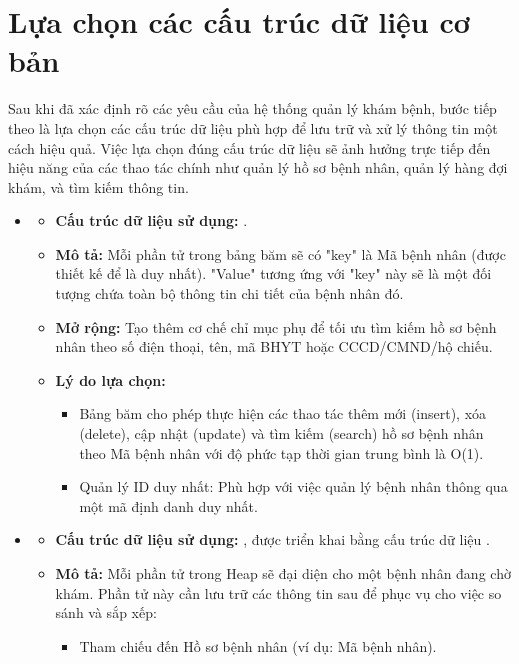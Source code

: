 \section{Lựa chọn các cấu trúc dữ liệu cơ bản}
Sau khi đã xác định rõ các yêu cầu của hệ thống quản lý khám bệnh, bước tiếp theo là lựa chọn các cấu trúc dữ liệu phù hợp để lưu trữ và xử lý thông tin một cách hiệu quả. Việc lựa chọn đúng cấu trúc dữ liệu sẽ ảnh hưởng trực tiếp đến hiệu năng của các thao tác chính như quản lý hồ sơ bệnh nhân, quản lý hàng đợi khám, và tìm kiếm thông tin.
\begin{itemize}
    \item {}
    \begin{itemize}
        \item {\bf Cấu trúc dữ liệu sử dụng:} .
        \item {\bf Mô tả:} Mỗi phần tử trong bảng băm sẽ có "key" là Mã bệnh nhân (được thiết kế để là duy nhất). "Value" tương ứng với "key" này sẽ là một đối tượng chứa toàn bộ thông tin chi tiết của bệnh nhân đó.
        \item {\bf Mở rộng:} Tạo thêm cơ chế chỉ mục phụ để tối ưu tìm kiếm hồ sơ bệnh nhân theo số điện thoại, tên, mã BHYT hoặc CCCD/CMND/hộ chiếu.
        \item {\bf Lý do lựa chọn:}
        \begin{itemize}
            \item Bảng băm cho phép thực hiện các thao tác thêm mới (insert), xóa (delete), cập nhật (update) và tìm kiếm (search) hồ sơ bệnh nhân theo Mã bệnh nhân với độ phức tạp thời gian trung bình là O(1). 
            \item Quản lý ID duy nhất: Phù hợp với việc quản lý bệnh nhân thông qua một mã định danh duy nhất.
        \end{itemize}
    \end{itemize}
    \item {}
    \begin{itemize}
        \item {\bf Cấu trúc dữ liệu sử dụng:} , được triển khai bằng cấu trúc dữ liệu .
        \item {\bf Mô tả:} Mỗi phần tử trong Heap sẽ đại diện cho một bệnh nhân đang chờ khám. Phần tử này cần lưu trữ các thông tin sau để phục vụ cho việc so sánh và sắp xếp:
        \begin{itemize}
            \item Tham chiếu đến Hồ sơ bệnh nhân (ví dụ: Mã bệnh nhân).

\end{itemize}
\end{itemize}
\end{itemize}
